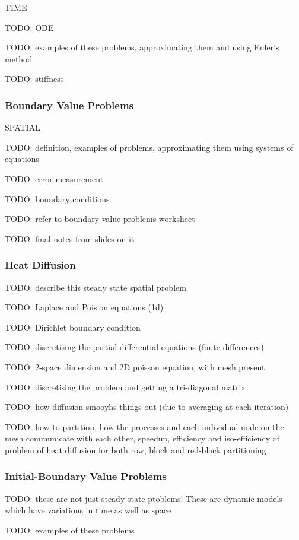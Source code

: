 \documentclass{article}
\begin{document}
TIME	

TODO: ODE

TODO: examples of these problems, approximating them and using Euler's method

TODO: stiffness

\subsubsection{Boundary Value Problems}

SPATIAL

TODO: definition, examples of problems, approximating them using systems of equations

TODO: error measurement

TODO: boundary conditions

TODO: refer to boundary value problems worksheet

TODO: final notes from slides on it

\subsubsection{Heat Diffusion}

TODO: describe this steady state spatial problem

TODO: Laplace and Poision equations (1d)

TODO: Dirichlet boundary condition

TODO: discretising the partial differential equations (finite differences)

TODO: 2-space dimension and 2D poisson equation, with mesh present

TODO: discretising the problem and getting a tri-diagonal matrix

TODO: how diffusion smooyhs things out (due to averaging at each iteration)

TODO: how to partition, how the processes and each individual node on the mesh communicate with each other, speedup, efficiency and iso-efficiency of problem of heat diffusion for both row, block and red-black partitioning

\subsubsection{Initial-Boundary Value Problems}

TODO:  these are not just steady-state ptoblems! These are dynamic models which have variations in time as well as space

TODO: examples of these problems
\end{document}
